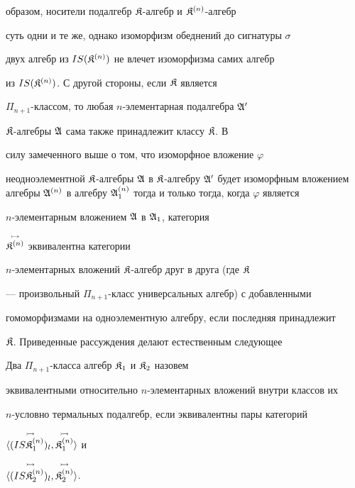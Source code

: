 образом, носители подалгебр $\frak K$-алгебр и $\frak K^{(n)}$-алгебр 


суть одни и те же, однако изоморфизм обеднений до сигнатуры $\sigma$ 


двух алгебр из $IS(\frak K^{(n)})$ не влечет изоморфизма самих алгебр 


из $IS(\frak K^{(n)})$. С другой стороны, если $\frak K$ является 


$\Pi_{n+1}$-классом, то любая $n$-элементарная подалгебра $\frak A'$\; 


$\frak K$-алгебры $\frak A$ сама также принадлежит классу $\frak K$. В 


силу замеченного выше о том, что изоморфное вложение $\varphi$ 


неодноэлементной $\frak K$-алгебры $\frak A$ в $\frak K$-алгебру $\frak 


A'$ будет изоморфным вложением алгебры $\frak A^{(n)}$ в алгебру $\frak 


A^{(n)}_1$ тогда и только тогда, когда $\varphi$ является 


$n$-элементарным вложением $\frak A$ в $\frak A_1$, категория 


$\overset{\rightarrowtail}{\frak K^{(n)}}{}$ эквивалентна категории 


$n$-элементарных вложений $\frak K$-алгебр друг в друга (где $\frak K$ 


--- произвольный $\Pi_{n+1}$-класс универсальных алгебр) с добавленными 


гомоморфизмами на одноэлементную алгебру, если последняя принадлежит 


$\frak K$. Приведенные рассуждения делают естественным следующее 


 


\begin{defn} 


Два $\Pi_{n+1}$-класса алгебр $\frak K_1$ и $\frak K_2$ назовем 


эквивалентными относительно $n$-элементарных вложений внутри классов их 


$n$-условно термальных подалгебр, если эквивалентны пары категорий 


$\la\up{\rightarrowtail}{(IS\frak K^{(n)}_1)_l}, 


\up{\rightarrowtail}{\frak K^{(n)}_1}\ra$ и 


$\la\up{\rightarrowtail}{(IS\frak K^{(n)}_2)_l}, 


\up{\rightarrowtail}{\frak K^{(n)}_2}\ra$. 


\end{defn} 


